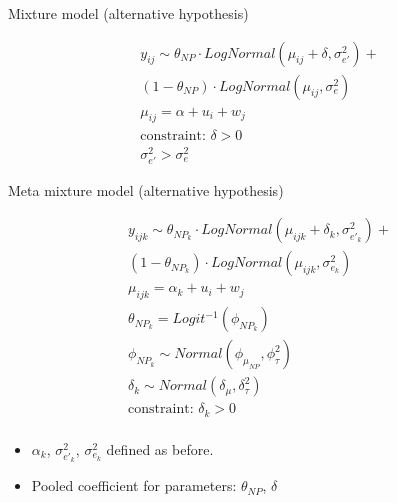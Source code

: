 \begin{frame}[fragile]{Mixture model (alternative hypothesis)}
	
	\begin{equation*}
		\begin{aligned}
		y_{ij} \sim \theta_{NP} \cdot LogNormal(\mu_{ij} + \delta, \sigma_{e'}^2) + \\
			(1 - \theta_{NP}) \cdot LogNormal(\mu_{ij}, \sigma_{e}^2) \\
			\mu_{ij} = \alpha + u_i + w_j\\
			\text{constraint: }\delta>0\\
			\sigma_{e'}^2 > \sigma_{e}^2 
		\end{aligned}
	\end{equation*}

	
\end{frame}

\begin{frame}[fragile]{Meta mixture model (alternative hypothesis)}

	\begin{equation*}
		\begin{aligned}
		y_{ijk} \sim \theta_{{NP}_k} \cdot LogNormal(\mu_{ijk} + \delta_k, \sigma_{e'_k}^2) + \\
			(1 - \theta_{{NP}_k}) \cdot LogNormal(\mu_{ijk}, \sigma_{e_k}^2) \\
			\mu_{ijk} = \alpha_k + u_i + w_j\\
			\theta_{{NP}_k} = Logit^{-1}(\phi_{{NP}_k})\\
			\phi_{{NP}_k} \sim Normal(\phi_{\mu_{NP}}, \phi_{\tau}^2)\\
			\delta_k \sim Normal(\delta_{\mu}, \delta_{\tau}^2)\\
			\text{constraint: }\delta_k>0\\
		\end{aligned}
	\end{equation*}
	
	\begin{small}	
		\begin{itemize}
			\item $\alpha_{k}$, $\sigma_{e'_k}^2$, $\sigma_{e_k}^2$ defined as before.
			\item Pooled coefficient for parameters: $\theta_{NP}$, $\delta$
		\end{itemize}
	\end{small}
	
\end{frame}


